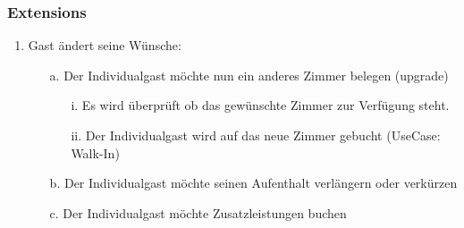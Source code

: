 \documentclass[./detailed_overview_usecases.tex]{subfiles}
\begin{document}
    \subsubsection*{Extensions}
    \begin{enumerate}
        \item Gast ändert seine Wünsche:
        \begin{itemize}
            \item[a.] Der Individualgast möchte nun ein anderes Zimmer belegen (upgrade)
            \begin{itemize}
                \item[i.] Es wird überprüft ob das gewünschte Zimmer zur Verfügung steht.
                \item[ii.] Der Individualgast wird auf das neue Zimmer gebucht (UseCase: Walk-In)
            \end{itemize}
            \item[b.] Der Individualgast möchte seinen Aufenthalt verlängern oder verkürzen
            \item[c.] Der Individualgast möchte Zusatzleistungen buchen
        \end{itemize}
    \end{enumerate}
\end{document}
